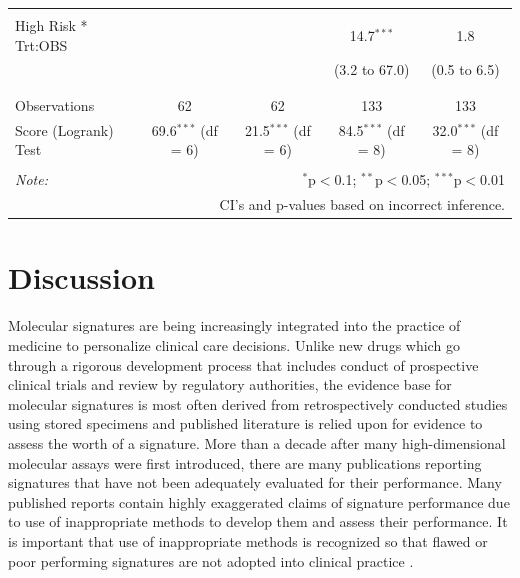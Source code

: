 \documentclass[11pt,]{article}
\begin{document}
\begin{table}[!htbp]
\begin{tabular}{@{\extracolsep{5pt}}lcccc}
  & & & & \\
 High Risk * Trt:OBS &  &  & 14.7$^{***}$ & 1.8 \\
  &  &  & (3.2 to 67.0) & (0.5 to 6.5) \\
  & & & & \\
\hline \\[-1.8ex]
Observations & 62 & 62 & 133 & 133 \\
Score (Logrank) Test & 69.6$^{***}$ (df = 6) & 21.5$^{***}$ (df = 6) & 84.5$^{***}$ (df = 8) & 32.0$^{***}$ (df = 8) \\
\hline
\hline \\[-1.8ex]
\textit{Note:}  & \multicolumn{4}{r}{$^{*}$p$<$0.1; $^{**}$p$<$0.05; $^{***}$p$<$0.01} \\
 & \multicolumn{4}{r}{CI's and p-values based on incorrect inference.} \\
\end{tabular}
\end{table}

\section{Discussion}\label{discussion}

Molecular signatures are being increasingly integrated into the practice
of medicine to personalize clinical care decisions. Unlike new drugs
which go through a rigorous development process that includes conduct of
prospective clinical trials and review by regulatory authorities, the
evidence base for molecular signatures is most often derived from
retrospectively conducted studies using stored specimens and published
literature is relied upon for evidence to assess the worth of a
signature. More than a decade after many high-dimensional molecular
assays were first introduced, there are many publications reporting
signatures that have not been adequately evaluated for their
performance. Many published reports contain highly exaggerated claims of
signature performance due to use of inappropriate methods to develop
them and assess their performance. It is important that use of
inappropriate methods is recognized so that flawed or poor performing
signatures are not adopted into clinical practice
\citep{mcshane2013criteria, mcshane2013criteriab}.
\end{document}
